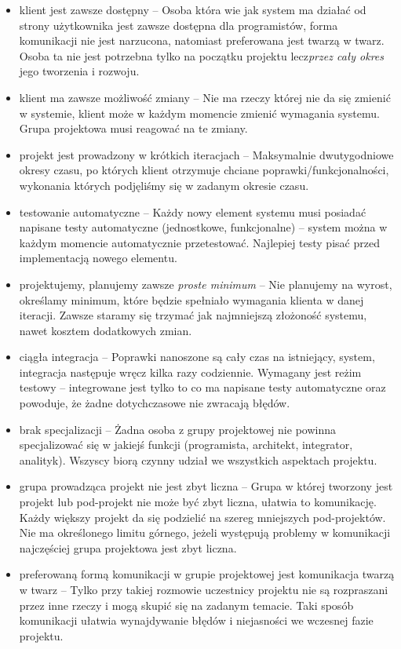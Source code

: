 \begin{itemize}
\item klient jest zawsze dostępny -- Osoba która wie jak system ma działać od strony użytkownika jest zawsze dostępna dla programistów, forma komunikacji nie jest narzucona, natomiast preferowana jest twarzą w twarz. Osoba ta nie jest potrzebna tylko na początku projektu lecz\emph{przez cały okres} jego tworzenia i rozwoju.
\item klient ma zawsze możliwość zmiany -- Nie ma rzeczy której nie da się zmienić w systemie, klient może w każdym momencie zmienić wymagania systemu. Grupa projektowa musi reagować na te zmiany.
\item projekt jest prowadzony w krótkich iteracjach -- Maksymalnie dwutygodniowe okresy czasu, po których klient otrzymuje chciane poprawki/funkcjonalności, wykonania których podjęliśmy się w zadanym okresie czasu.
\item testowanie automatyczne -- Każdy nowy element systemu musi posiadać napisane testy automatyczne (jednostkowe, funkcjonalne) -- system można w każdym momencie automatycznie przetestować. Najlepiej testy pisać przed implementacją nowego elementu.
\item projektujemy, planujemy zawsze \emph{proste minimum} -- Nie planujemy na wyrost, określamy minimum, które będzie spełniało wymagania klienta w danej iteracji. Zawsze staramy się trzymać jak najmniejszą złożoność systemu, nawet kosztem dodatkowych zmian.
\item ciągła integracja -- Poprawki nanoszone są cały czas na istniejący, system, integracja następuje wręcz kilka razy codziennie. Wymagany jest reżim testowy -- integrowane jest tylko to co ma napisane testy automatyczne oraz powoduje, że żadne dotychczasowe nie zwracają błędów.
\item brak specjalizacji -- Żadna osoba z grupy projektowej nie powinna specjalizować się w jakiejś funkcji (programista, architekt, integrator, analityk). Wszyscy biorą czynny udział we wszystkich aspektach projektu.
\item grupa prowadząca projekt nie jest zbyt liczna -- Grupa w której tworzony jest projekt lub pod-projekt nie może być zbyt liczna, ułatwia to komunikację. Każdy większy projekt da się podzielić na szereg mniejszych pod-projektów. Nie ma określonego limitu górnego, jeżeli występują problemy w komunikacji najczęściej grupa projektowa jest zbyt liczna.
\item preferowaną formą komunikacji w grupie projektowej jest komunikacja twarzą w twarz -- Tylko przy takiej rozmowie uczestnicy projektu nie są rozpraszani przez inne rzeczy i mogą skupić się na zadanym temacie. Taki sposób komunikacji ułatwia wynajdywanie błędów i niejasności we wczesnej fazie projektu.

\end{itemize}
